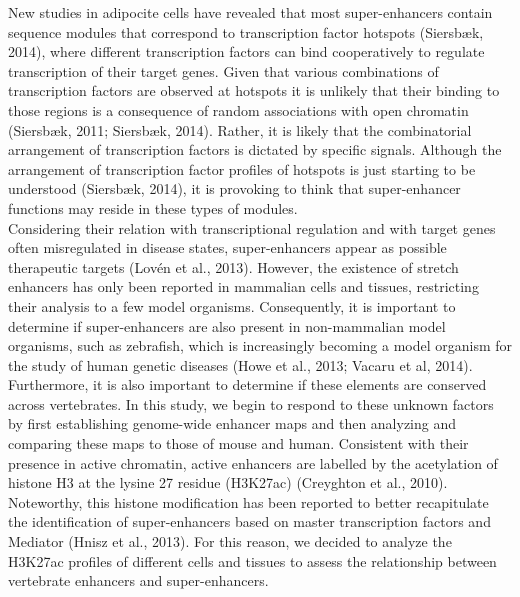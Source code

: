 	New studies in adipocite cells have revealed that most super-enhancers contain sequence modules that correspond to transcription factor hotspots (Siersb\ae k, 2014), where different transcription factors can bind cooperatively to regulate transcription of their target genes. Given that various combinations of transcription factors are observed at hotspots it is unlikely that their binding to those regions is a consequence of random associations with open chromatin (Siersb\ae k, 2011; Siersb\ae k, 2014). Rather, it is likely that the combinatorial arrangement of transcription factors is dictated by specific signals. Although the arrangement of transcription factor profiles of hotspots is just starting to be understood (Siersb\ae k, 2014), it is provoking to think that super-enhancer functions may reside in these types of modules.\\

	Considering their relation with transcriptional regulation and with target genes often misregulated in disease states, super-enhancers appear as possible therapeutic targets (Lov\'en et al., 2013). However, the existence of stretch enhancers has only been reported in mammalian cells and tissues, restricting their analysis to a few model organisms. Consequently, it is important to determine if super-enhancers are also present in non-mammalian model organisms, such as zebrafish, which is increasingly becoming a model organism for the study of human genetic diseases (Howe et al., 2013; Vacaru et al, 2014). Furthermore, it is also important to determine if these elements are conserved across vertebrates. In this study, we begin to respond to these unknown factors by first establishing genome-wide enhancer maps and then analyzing and comparing these maps to those of mouse and human. Consistent with their presence in active chromatin, active enhancers are labelled by the acetylation of histone H3 at the lysine 27 residue (H3K27ac) (Creyghton et al., 2010). Noteworthy, this histone modification has been reported to better recapitulate the identification of super-enhancers based on master transcription factors and Mediator (Hnisz et al., 2013). For this reason, we decided to analyze the H3K27ac profiles of different cells and tissues to assess the relationship between vertebrate enhancers and super-enhancers.\\

